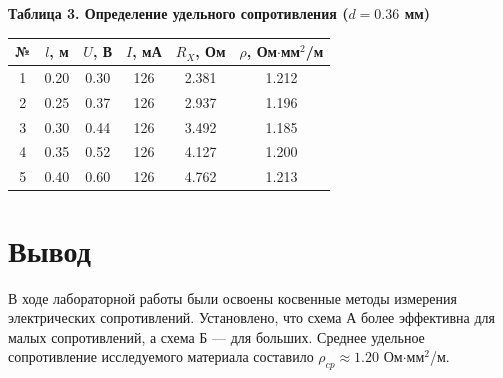 \documentclass[a4paper,14pt]{extarticle}
\begin{document}
\begin{center}
\small
\textbf{Таблица 3. Определение удельного сопротивления ($d = 0.36$ мм)}
\begin{tabular}{|c|c|c|c|c|c|}
\hline
№ & $l$, м & $U$, В & $I$, мА & $R_X$, Ом & $\rho$, Ом$\cdot$мм$^2$/м \\ \hline
1 & 0.20 & 0.30 & 126 & 2.381 & 1.212 \\ \hline
2 & 0.25 & 0.37 & 126 & 2.937 & 1.196 \\ \hline
3 & 0.30 & 0.44 & 126 & 3.492 & 1.185 \\ \hline
4 & 0.35 & 0.52 & 126 & 4.127 & 1.200 \\ \hline
5 & 0.40 & 0.60 & 126 & 4.762 & 1.213 \\ \hline
\end{tabular}
\end{center}

\section*{Вывод}
В ходе лабораторной работы были освоены косвенные методы измерения электрических сопротивлений. Установлено, что схема А более эффективна для малых сопротивлений, а схема Б — для больших. Среднее удельное сопротивление исследуемого материала составило $\rho_{cp} \approx 1.20$ Ом$\cdot$мм$^2$/м.
\end{document}
